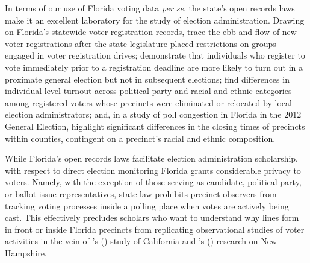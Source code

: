 \documentclass[12pt,titlepage]{article}
\newcommand{\possessivecite}[1]{\citeauthor{#1}'s (\citeyear{#1})}
\begin{document}

In terms of our use of Florida voting data \emph{per se}, the state's
open records laws make it an excellent laboratory for the study of
election administration. Drawing on Florida's statewide voter
registration records, \cite{herron_smith2013} trace the ebb and flow
of new voter registrations after the state legislature placed
restrictions on groups engaged in voter registration drives;
\cite{shinosmith:registrationtiming} demonstrate that individuals who
register to vote immediately prior to a registration deadline are more
likely to turn out in a proximate general election but not in
subsequent elections; \cite{amos_etal2017} find differences in
individual-level turnout across political party and racial and ethnic
categories among registered voters whose precincts were eliminated or
relocated by local election administrators; and, in a study of poll
congestion in Florida in the 2012 General Election,
\cite{herronsmith:closingtimes} highlight significant differences in
the closing times of precincts within counties, contingent on a
precinct's racial and ethnic composition.



While Florida's open records laws facilitate election administration
scholarship, with respect to direct election monitoring Florida grants
considerable privacy to voters.  Namely, with the exception of those
serving as candidate, political party, or ballot issue
representatives, state law prohibits precinct observers from tracking
voting processes inside a polling place when votes are actively being
cast. This effectively precludes scholars who want to understand why
lines form in front or inside Florida precincts from replicating
observational studies of voter activities in the vein of
\possessivecite{spencermarkovits:renege} study of California and
\possessivecite{herronsmith:hanoverstudy} research on New Hampshire.
\end{document}
